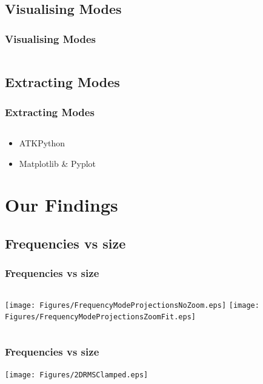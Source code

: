 \documentclass[hyperref={colorlinks=true,urlcolor=blue,linkcolor=.},aspectratio=1610,mathserif]{beamer}
\begin{document}
\subsection{Visualising Modes}

\begin{frame}
 \frametitle{Visualising Modes}
 \begin{columns}[T]
 \end{columns}
\end{frame}

\subsection{Extracting Modes}

\begin{frame}
 \frametitle{Extracting Modes}
 \begin{listing}[H]
  \inputminted[python3=true,bgcolor=Black,linenos=true,firstline=66,lastline=71,breaklines=true,breakautoindent=true]{python}{VNL/PythonScripts/Scripts/2DdataExtract.py}
 \end{listing}
 \begin{itemize}[<+->]
  \pause
  \item ATKPython
  \item Matplotlib \& Pyplot
 \end{itemize}
\end{frame}

\section{Our Findings}

\subsection{Frequencies vs size}

\begin{frame}
 \frametitle{Frequencies vs size}
 \begin{columns}[T]
  \texttt{[image: Figures/FrequencyModeProjectionsNoZoom.eps]}
  \texttt{[image: Figures/FrequencyModeProjectionsZoomFit.eps]}
 \end{columns}
\end{frame}

\begin{frame}
 \frametitle{Frequencies vs size}
 \begin{center}
  \texttt{[image: Figures/2DRMSClamped.eps]}
 \end{center}
\end{frame}
\end{document}
